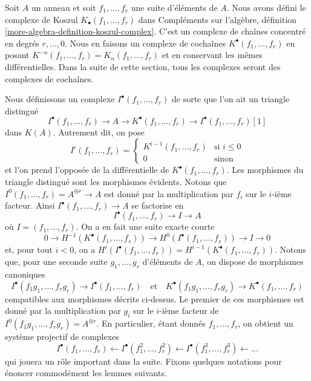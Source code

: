 \noindent
Soit $A$ un anneau et soit $f_1, \ldots, f_r$ une suite d'éléments
de $A$. Nous avons défini le complexe de Koszul
$K_\bullet(f_1, \ldots, f_r)$ dans
Compléments sur l'algèbre, définition \ref{more-algebra-definition-koszul-complex}.
C'est un complexe de chaînes concentré en degrés $r, \ldots, 0$.
Nous en faisons un complexe de cochaînes $K^\bullet(f_1, \ldots, f_r)$
en posant $K^{-n}(f_1, \ldots, f_r) = K_n(f_1, \ldots, f_r)$
et en conservant les mêmes différentielles. Dans la suite de cette section, tous
les complexes seront des complexes de cochaînes.

\medskip\noindent
Nous définissons un complexe $I^\bullet(f_1, \ldots, f_r)$
de sorte que l'on ait un triangle distingué
$$
I^\bullet(f_1, \ldots, f_r) \to
A \to
K^\bullet(f_1, \ldots, f_r) \to
I^\bullet(f_1, \ldots, f_r)[1]
$$
dans $K(A)$.
Autrement dit, on pose
$$
I^i(f_1, \ldots, f_r) =
\left\{
\begin{matrix}
K^{i - 1}(f_1, \ldots, f_r) & \text{si } i \leq 0 \\
0 & \text{sinon}
\end{matrix}
\right.
$$
et l'on prend l'opposée de la différentielle de $K^\bullet(f_1, \ldots, f_r)$.
Les morphismes du triangle distingué sont les morphismes évidents. Notons que
$I^0(f_1, \ldots, f_r) = A^{\oplus r} \to A$ est donné par
la multiplication par $f_i$ sur le $i$-ième facteur.
Ainsi $I^\bullet(f_1, \ldots, f_r) \to A$ se factorise en
$$
I^\bullet(f_1, \ldots, f_r) \to I \to A
$$
où $I = (f_1, \ldots, f_r)$. On a en fait une suite exacte courte
$$
0 \to H^{-1}(K^\bullet(f_1, \ldots, f_s)) \to
H^0(I^\bullet(f_1, \ldots, f_s)) \to I \to 0
$$
et, pour tout $i < 0$, on a
$H^i(I^\bullet(f_1, \ldots, f_r)) = H^{i - 1}(K^\bullet(f_1, \ldots, f_r))$.
Notons que, pour une seconde suite $g_1, \ldots, g_r$ d'éléments de $A$,
on dispose de morphismes canoniques
$$
I^\bullet(f_1g_1, \ldots, f_rg_r) \to I^\bullet(f_1, \ldots, f_r)
\quad\text{et}\quad
K^\bullet(f_1g_1, \ldots, f_rg_r) \to K^\bullet(f_1, \ldots, f_r)
$$
compatibles aux morphismes décrits ci-dessus. Le premier de ces morphismes est
donné par la multiplication par $g_i$ sur le $i$-ième facteur de
$I^0(f_1g_1, \ldots, f_rg_r) = A^{\oplus r}$. En particulier, étant donnés
$f_1, \ldots, f_r$, on obtient un système projectif de complexes
\begin{equation}
\label{equation-system}
I^\bullet(f_1, \ldots, f_r) \leftarrow
I^\bullet(f_1^2, \ldots, f_r^2) \leftarrow
I^\bullet(f_1^3, \ldots, f_r^3) \leftarrow \ldots
\end{equation}
qui jouera un rôle important dans la suite.
Fixons quelques notations pour énoncer commodément les lemmes suivants.

